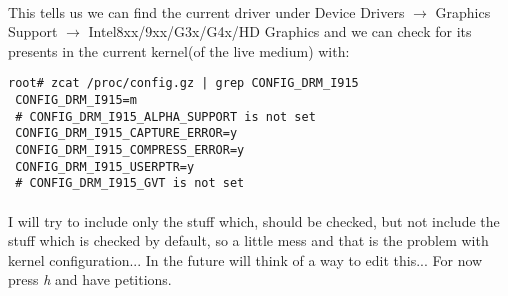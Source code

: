 \documentclass[10pt,a4paper]{article}
\begin{document}
                \paragraph{} This tells us we can find the current driver under Device Drivers $ \rightarrow $ Graphics Support $ \rightarrow $ Intel8xx/9xx/G3x/G4x/HD Graphics and we can check for its presents in the current kernel(of the live medium) with:
                
                \begin{lstlisting}[style=BashInputRoot]
root# zcat /proc/config.gz | grep CONFIG_DRM_I915
 CONFIG_DRM_I915=m
 # CONFIG_DRM_I915_ALPHA_SUPPORT is not set
 CONFIG_DRM_I915_CAPTURE_ERROR=y
 CONFIG_DRM_I915_COMPRESS_ERROR=y
 CONFIG_DRM_I915_USERPTR=y
 # CONFIG_DRM_I915_GVT is not set
                \end{lstlisting}
                
                \paragraph{} I will try to include only the stuff which, should be checked, but not include the stuff which is checked by default, so a little mess and that is the problem with kernel configuration... In the future will think of a way to edit this... For now press \textit{h} and have petitions.
                
\end{document}
